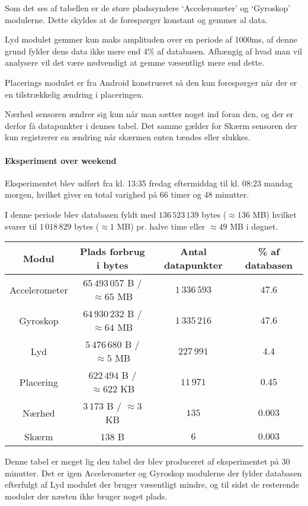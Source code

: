 Som det ses af tabellen er de store pladssyndere `Accelerometer' og `Gyroskop' modulerne.
Dette skyldes at de forespørger konstant og gemmer al data.

Lyd modulet gemmer kun maks amplituden over en periode af 1000ms, af denne grund fylder dens data ikke mere end 4\% af databasen.
Afhængig af hvad man vil analysere vil det være nødvendigt at gemme væsentligt mere end dette.

Placerings modulet er fra Android konstrueret så den kun forespørger når der er en tilstrækkelig ændring i placeringen.

Nærhed sensoren ændrer sig kun når man sætter noget ind foran den, og der er derfor få datapunkter i dennes tabel.
Det samme gælder for Skærm sensoren der kun registrerer en ændring når skærmen enten tændes eller slukkes.	

\paragraph{Eksperiment over weekend}

Eksperimentet blev udført fra kl. 13:35 fredag eftermiddag til kl. 08:23 mandag morgen, hvilket giver en total varighed på 66 timer og 48 minutter.

I denne periode blev databasen fyldt med  $136\,523\,139$ bytes ($\approx136$ MB) hvilket svarer til $1\,018\,829$ bytes ($\approx1$ MB) pr. halve time eller $\approx49$ MB i døgnet.

\begin{tabular}{|c|c|c|c|}
	\hline Modul 		 & Plads forbrug i bytes	  			& Antal datapunkter 	& \% af databasen \\
	\hline Accelerometer & $65\,493\,057$ B / $\approx65$ MB   	& $1\,336\,593$    		& $47.6$ \\ 
	\hline Gyroskop 	 & $64\,930\,232$ B / $\approx64$ MB  	& $1\,335\,216$   		& $47.6$ \\ 
	\hline Lyd 		  	 & $5\,476\,680$ B / $\approx5$  MB  	& $227\,991$     		& $4.4$ \\ 
	\hline Placering 	 & $622\,494$ B	/ $\approx622$ KB		& $11\,971$      		& $0.45$ \\ 
	\hline Nærhed    	 & $3\,173$ B	/ $\approx3$ KB			& $135$ 				& $0.003$ \\ 
	\hline Skærm 		 & $138$ B          					& $6$          			& $0.003$ \\ 
	\hline 
\end{tabular} 

Denne tabel er meget lig den tabel der blev produceret af eksperimentet på 30 minutter.
Det er igen Accelerometer og Gyroskop modulerne der fylder databasen efterfulgt af Lyd modulet der bruger væsentligt mindre, og til sidst de resterende moduler der næsten ikke bruger noget plads.

